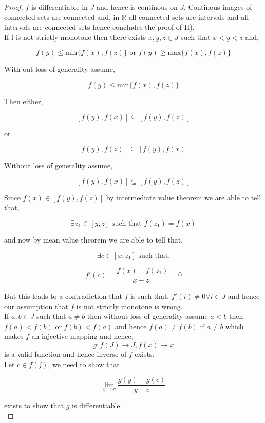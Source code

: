 \documentclass[11pt,a4paper]{colorart}
\def\R{\mathbb{R}}
\def\ra{\rightarrow}
\begin{document}
\begin{proof}

	$f$ is differentiable in $J$ and hence is continous on $J$. Continous images of connected sets are connected and, in $\R$ all connected sets are intervals and all intervals are connected sets hence concludes the proof of II).\\

	If f is not strictly monotone then there exists $x,y,z \in J$ such that $x<y<z$ and, 
	
	\[ f(y) \leq \text{min} \{f(x),f(z)\} \text{ or } f(y) \geq \text{max} \{f(x),f(z)\}\]
	
	With out loss of generality assume, 
	
	\[ f(y) \leq \text{min} \{f(x),f(z)\} \]

	Then either,
	
	\[ [ f(y),f(x) ] \subseteq  [ f(y),f(z) ] \]
	
	or
	
	\[ [ f(y),f(z) ] \subseteq  [ f(y),f(x) ] \]
	
	Without loss of generality assume, 
	
	\[ [ f(y),f(x) ] \subseteq  [ f(y),f(z) ] \]

	Since $f(x) \in [ f(y),f(z) ]$ by intermediate value theorem we are able to tell that,
	
	\[ \exists z_1 \in [y,z] \text{ such that } f(z_1) = f(x) \]
	
	and now by mean value theorem we are able to tell that,
	
	\[ \exists c \in [x,z_1] \text{ such that,}\]
	
	\[ f'(c) = \frac{ f(x) - f(z_1) }{ x-z_1 } = 0 \]

	But this leads to a contradiction that $f$ is such that, $f'(i) \neq 0 \forall i \in J$ and hence our assumption that $f$ is not strictly monotone is wrong.\\

	If $a,b \in J$ such that $a \neq b$ then without loss of generality assume $a<b$ then $f(a) < f(b)$ or $f(b) < f(a)$ and hence $f(a) \neq f(b)$ if $a \neq b$ which makes $f$ an injective mapping and hence,
	\[ g: f(J) \ra J, f(x) \ra x \]
	is a valid function and hence inverse of $f$ exists.\\
	
	Let $c \in f(j)$, we need to show that
	
	\[ \lim_{y \ra c } \frac{ g(y) - g(c) }{ y-c } \]
	
	exists to show that $g$ is differentiable.\\


\end{proof}
\end{document}
